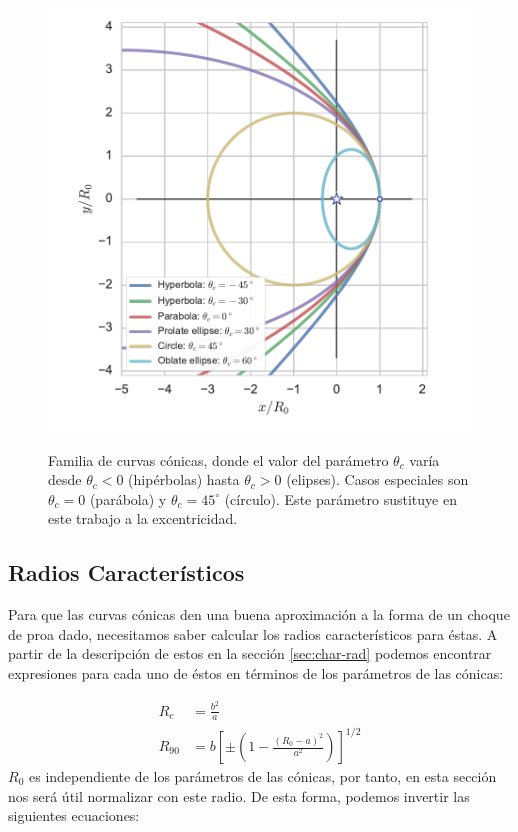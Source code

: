 \begin{figure}
  \includegraphics[width = \linewidth]{./Figures/conic1}
  \label{fig:conics-family}
  \caption{Familia de curvas cónicas, donde el valor del parámetro $\theta_c$ varía desde
    $\theta_c <0$ (hipérbolas) hasta $\theta_c > 0$ (elipses). Casos especiales son $\theta_c = 0$
  (parábola) y $\theta_c = 45^\circ$ (círculo). Este parámetro sustituye en este trabajo a la excentricidad.}
\end{figure}

\subsection{Radios Característicos}

Para que las curvas cónicas den una buena aproximación a la forma de un choque de proa dado, necesitamos saber
calcular los radios característicos para éstas. A partir de la descripción de estos en la sección
\ref{sec:char-rad} podemos encontrar expresiones para cada uno de éstos en términos de los parámetros de las
cónicas:

\begin{align}
  R_c &= \frac{b^2}{a} \label{eq:R-curv-conic}\\
  R_{90} &= b\left[\pm\left(1 - \frac{(R_0 - a)^2}{a^2}\right)\right]^{1/2} \label{eq:R90-conic}
\end{align}
$R_0$ es independiente de los parámetros de las cónicas, por tanto, en
esta sección nos será útil normalizar con este radio. De esta forma,
podemos invertir las siguientes ecuaciones:


